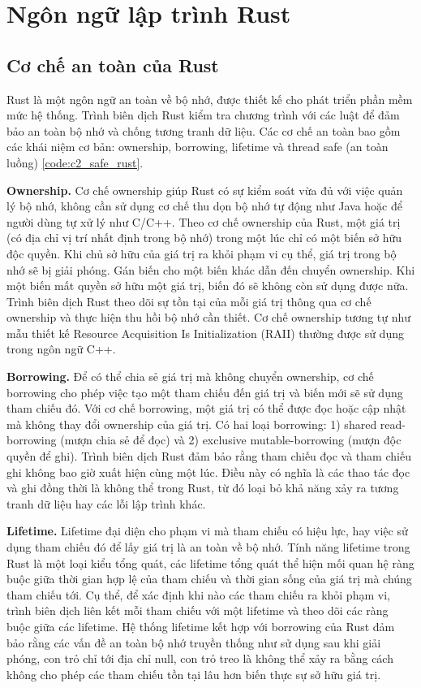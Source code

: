 \section{Ngôn ngữ lập trình Rust}

\subsection{Cơ chế an toàn của Rust}

Rust là một ngôn ngữ an toàn về bộ nhớ, được thiết kế cho phát triển phần mềm mức hệ thống.
Trình biên dịch Rust kiểm tra chương trình với các luật để đảm bảo an toàn bộ nhớ và chống tương tranh dữ liệu.
Các cơ chế an toàn bao gồm các khái niệm cơ bản: ownership, borrowing, lifetime và thread safe (an toàn luồng) \ref{code:c2_safe_rust}.

\textbf{Ownership.} Cơ chế ownership giúp Rust có sự kiểm soát vừa đủ với việc quản lý bộ nhớ, không cần sử dụng cơ chế thu dọn bộ nhớ tự động như Java hoặc để người dùng tự xử lý như C/C++.
Theo cơ chế ownership của Rust, một giá trị (có địa chỉ vị trí nhất định trong bộ nhớ) trong một lúc chỉ có một biến sở hữu độc quyền.
Khi chủ sở hữu của giá trị ra khỏi phạm vi cụ thể, giá trị trong bộ nhớ sẽ bị giải phóng.
Gán biến cho một biến khác dẫn đến chuyển ownership.
Khi một biến mất quyền sở hữu một giá trị, biến đó sẽ không còn sử dụng được nữa.
Trình biên dịch Rust theo dõi sự tồn tại của mỗi giá trị thông qua cơ chế ownership và thực hiện thu hồi bộ nhớ cần thiết.
Cơ chế ownership tương tự như mẫu thiết kế Resource Acquisition Is Initialization (RAII) \cite{cppreferenceRAIICppreferencecom} thường được sử dụng trong ngôn ngữ C++.

\textbf{Borrowing.} Để có thể chia sẻ giá trị mà không chuyển ownership, cơ chế borrowing cho phép việc tạo một tham chiếu đến giá trị và biến mới sẽ sử dụng tham chiếu đó.
Với cơ chế borrowing, một giá trị có thể được đọc hoặc cập nhật mà không thay đổi ownership của giá trị.
Có hai loại borrowing: 1) shared read-borrowing (mượn chia sẻ để đọc) và 2) exclusive mutable-borrowing (mượn độc quyền để ghi).
Trình biên dịch Rust đảm bảo rằng tham chiếu đọc và tham chiếu ghi không bao giờ xuất hiện cùng một lúc.
Điều này có nghĩa là các thao tác đọc và ghi đồng thời là không thể trong Rust, từ đó loại bỏ khả năng xảy ra tương tranh dữ liệu hay các lỗi lập trình khác.

\textbf{Lifetime.} Lifetime đại diện cho phạm vi mà tham chiếu có hiệu lực, hay việc sử dụng tham chiếu đó để lấy giá trị là an toàn về bộ nhớ.
Tính năng lifetime trong Rust là một loại kiểu tổng quát, các lifetime tổng quát thể hiện mối quan hệ ràng buộc giữa thời gian hợp lệ của tham chiếu và thời gian sống của giá trị mà chúng tham chiếu tới.
Cụ thể, để xác định khi nào các tham chiếu ra khỏi phạm vi, trình biên dịch liên kết mỗi tham chiếu với một lifetime và theo dõi các ràng buộc giữa các lifetime.
Hệ thống lifetime kết hợp với borrowing của Rust đảm bảo rằng các vấn đề an toàn bộ nhớ truyền thống như sử dụng sau khi giải phóng, con trỏ chỉ tới địa chỉ null, con trỏ treo là không thể xảy ra bằng cách không cho phép các tham chiếu tồn tại lâu hơn biến thực sự sở hữu giá trị.

